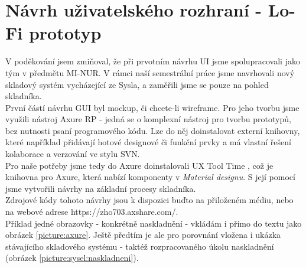 \section{Návrh uživatelského rozhraní - Lo-Fi prototyp}

V poděkování jsem zmiňoval, že při prvotním návrhu UI jsme spolupracovali jako tým v předmětu MI-NUR. V rámci naší semestrální práce jsme navrhovali nový skladový systém vycházející ze Sysla, a zaměřili jsme se pouze na pohled skladníka.\\
První částí návrhu GUI byl mockup, či chcete-li wireframe. Pro jeho tvorbu jsme využili nástroj Axure RP \cite{axure} - jedná se o komplexní nástroj pro tvorbu prototypů, bez nutnosti psaní programového kódu. Lze do něj doinstalovat externí knihovny, které například přidávají hotové designové či funkční prvky a má vlastní řešení kolaborace a verzování ve stylu SVN.\\
Pro naše potřeby jsme tedy do Axure doinstalovali UX Tool Time \cite{uxtooltime}, což je knihovna pro Axure, která nabízí komponenty v \emph{Material designu}. S její pomocí jsme vytvořili návrhy na základní procesy skladníka.\\
Zdrojové kódy tohoto návrhy jsou k dispozici buďto na přiloženém médiu, nebo na webové adrese https://zho703.axshare.com/.\\
Příklad jedné obrazovky - konkrétně naskladnění - vkládám i přímo do textu jako obrázek \ref{picture:axure}. Ještě předtím je ale pro porovnání vložena i ukázka stávajícího skladového systému - taktéž rozpracovaného úkolu naskladnění (obrázek \ref{picture:sysel:naskladneni}).

